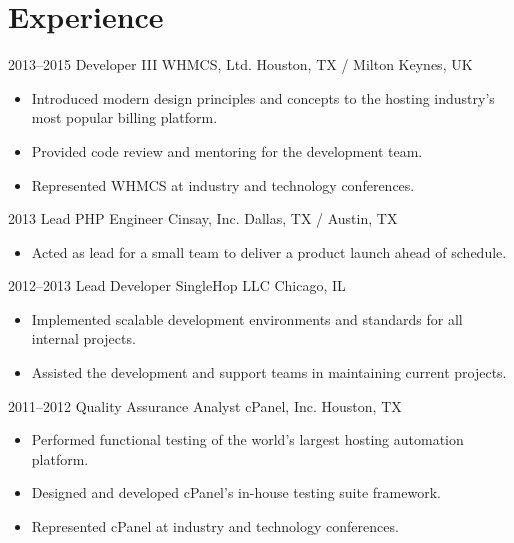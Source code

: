 \documentclass[11pt,a4paper,sans]{moderncv}
\begin{document}
    \section{Experience}
        \cventry
            {2013--2015}
            {Developer III}
            {WHMCS, Ltd.}
            {Houston, TX / Milton Keynes, UK}
            {}
            {
                \begin{itemize}
                    \item Introduced modern design principles and concepts to the hosting industry's most popular billing platform.
                    \item Provided code review and mentoring for the development team.
                    \item Represented WHMCS at industry and technology conferences.
                \end{itemize}
            }

        \cventry
            {2013}
            {Lead PHP Engineer}
            {Cinsay, Inc.}
            {Dallas, TX / Austin, TX}
            {}
            {
                \begin{itemize}
                    \item Acted as lead for a small team to deliver a product launch ahead of schedule.
                \end{itemize}
            }

        \cventry
            {2012--2013}
            {Lead Developer}
            {SingleHop LLC}
            {Chicago, IL}
            {}
            {
                \begin{itemize}
                    \item Implemented scalable development environments and standards for all internal projects.
                    \item Assisted the development and support teams in maintaining current projects.
                \end{itemize}
            }

        \cventry
            {2011--2012}
            {Quality Assurance Analyst}
            {cPanel, Inc.}
            {Houston, TX}
            {}
            {
                \begin{itemize}
                    \item Performed functional testing of the world's largest hosting automation platform.
                    \item Designed and developed cPanel's in-house testing suite framework.
                    \item Represented cPanel at industry and technology conferences.
                \end{itemize}
            }
\end{document}
